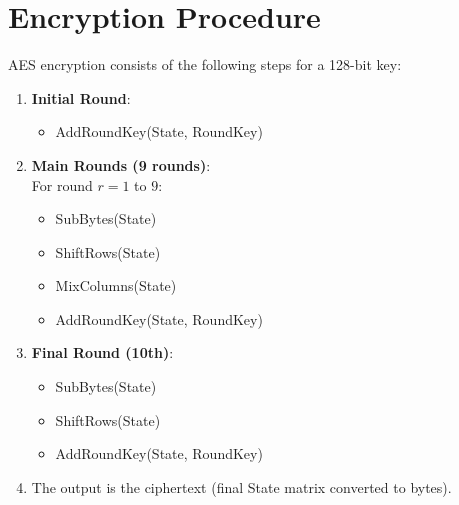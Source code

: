 \documentclass[12pt,a4paper]{report}
\begin{document}
\section{Encryption Procedure}
AES encryption consists of the following steps for a 128-bit key:
\begin{enumerate}
\item \textbf{Initial Round}:
\begin{itemize}
\item AddRoundKey(State, RoundKey)
\end{itemize}

\item \textbf{Main Rounds (9 rounds)}:\\
For round $r = 1$ to $9$:
\begin{itemize}
    \item SubBytes(State)
    \item ShiftRows(State)
    \item MixColumns(State)
    \item AddRoundKey(State, RoundKey)
\end{itemize}

\item \textbf{Final Round (10th)}:
\begin{itemize}
    \item SubBytes(State)
    \item ShiftRows(State)
    \item AddRoundKey(State, RoundKey)
\end{itemize}

\item The output is the ciphertext (final State matrix converted to bytes).
\end{enumerate}
\end{document}
